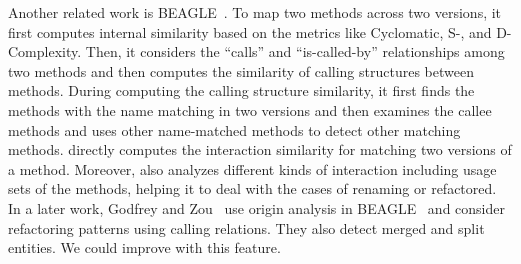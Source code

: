 Another related work is BEAGLE~\cite{godfrey02}. To map two methods
across two versions, it first computes internal similarity based on
the metrics like Cyclomatic, S-, and D-Complexity. Then, it considers
the ``calls'' and ``is-called-by'' relationships among two methods and
then computes the similarity of calling structures between methods.
During computing the calling structure similarity, it first finds
the methods with the name matching in two versions and then 
examines the callee methods and uses other name-matched methods to
detect other matching methods. {\tool} directly computes the
interaction similarity for matching two versions of a method.
%
Moreover, {\tool} also analyzes different kinds of interaction
including usage sets of the methods, helping it to deal with the cases
of renaming or refactored. In a later work, Godfrey and
Zou~\cite{godfrey05} use origin analysis in BEAGLE~\cite{godfrey02}
and consider refactoring patterns using calling relations. They also
detect merged and split entities. We could improve {\tool} with this feature.







